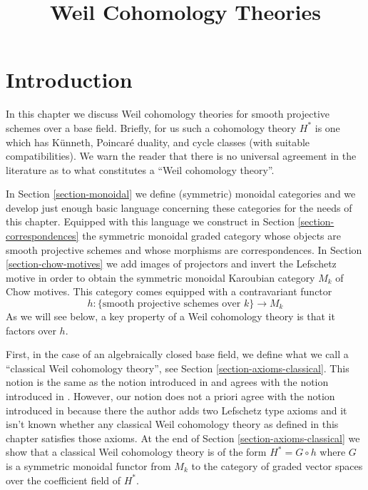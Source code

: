 

%


\title{Weil Cohomology Theories}


\maketitle

\label{section-phantom}

\tableofcontents



\section{Introduction}
\label{section-introduction}

\noindent
In this chapter we discuss Weil cohomology theories for smooth
projective schemes over a base field. Briefly, for us such a cohomology
theory $H^*$ is one which has K\"unneth, Poincar\'e duality,
and cycle classes (with suitable compatibilities). We warn the reader that
there is no universal agreement in the literature as to what
constitutes a ``Weil cohomology theory''.

\medskip\noindent
In Section \ref{section-monoidal} we define (symmetric) monoidal
categories and we develop just enough basic language concerning
these categories for the needs of this chapter. Equipped with this
language we construct in
Section \ref{section-correspondences} the symmetric monoidal
graded category whose objects are smooth projective schemes and
whose morphisms are correspondences. In Section \ref{section-chow-motives}
we add images of projectors and invert the Lefschetz motive in
order to obtain the symmetric monoidal Karoubian category $M_k$
of Chow motives. This category comes equipped with a contravariant functor
$$
h : \{\text{smooth projective schemes over }k\} \longrightarrow M_k
$$
As we will see below, a key property of a Weil cohomology theory is
that it factors over $h$.

\medskip\noindent
First, in the case of an algebraically closed base field, we define
what we call a ``classical Weil cohomology theory'',
see Section \ref{section-axioms-classical}. This notion is the
same as the notion introduced in \cite[Section 1.2]{Kleiman-cycles} and
agrees with the notion introduced in \cite[page 65]{Kleiman-motives}.
However, our notion does not a priori agree with the notion introduced in
\cite[page 10]{Kleiman-standard} because there the author adds two Lefschetz
type axioms and it isn't known whether any classical Weil cohomology
theory as defined in this chapter satisfies those axioms.
At the end of Section \ref{section-axioms-classical} we show that
a classical Weil cohomology theory is of the form $H^* = G \circ h$
where $G$ is a symmetric monoidal functor from $M_k$ to the category
of graded vector spaces over the coefficient field of $H^*$.

